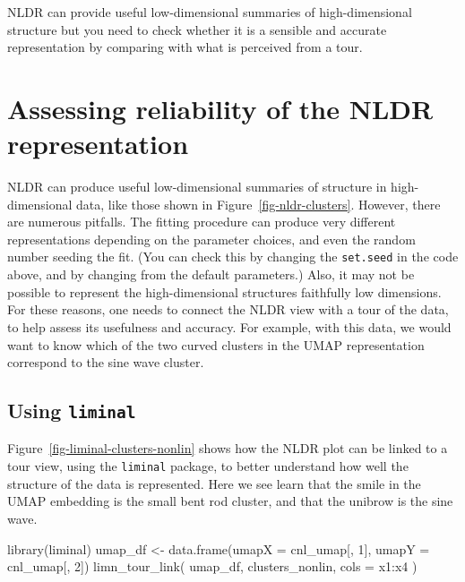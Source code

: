 \documentclass[
  letterpaper,
]{krantz}
\newenvironment{Shaded}{\begin{snugshade}}{\end{snugshade}}
\newcommand{\AttributeTok}[1]{\textcolor[rgb]{0.40,0.45,0.13}{#1}}
\newcommand{\DecValTok}[1]{\textcolor[rgb]{0.68,0.00,0.00}{#1}}
\newcommand{\FunctionTok}[1]{\textcolor[rgb]{0.28,0.35,0.67}{#1}}
\newcommand{\NormalTok}[1]{\textcolor[rgb]{0.00,0.23,0.31}{#1}}
\newcommand{\OtherTok}[1]{\textcolor[rgb]{0.00,0.23,0.31}{#1}}
\newcommand{\SpecialCharTok}[1]{\textcolor[rgb]{0.37,0.37,0.37}{#1}}
\begin{document}
NLDR can provide useful low-dimensional summaries of high-dimensional
structure but you need to check whether it is a sensible and accurate
representation by comparing with what is perceived from a tour.

\section{Assessing reliability of the NLDR
representation}\label{assessing-reliability-of-the-nldr-representation}

NLDR can produce useful low-dimensional summaries of structure in
high-dimensional data, like those shown in
Figure~\ref{fig-nldr-clusters}. However, there are numerous pitfalls.
The fitting procedure can produce very different representations
depending on the parameter choices, and even the random number seeding
the fit. (You can check this by changing the \texttt{set.seed} in the
code above, and by changing from the default parameters.) Also, it may
not be possible to represent the high-dimensional structures faithfully
low dimensions. For these reasons, one needs to connect the NLDR view
with a tour of the data, to help assess its usefulness and accuracy. For
example, with this data, we would want to know which of the two curved
clusters in the UMAP representation correspond to the sine wave cluster.

\subsection{\texorpdfstring{Using
\texttt{liminal}}{Using liminal}}\label{using-liminal}


Figure~\ref{fig-liminal-clusters-nonlin} shows how the NLDR plot can be
linked to a tour view, using the \texttt{liminal} package, to better
understand how well the structure of the data is represented. Here we
see learn that the smile in the UMAP embedding is the small bent rod
cluster, and that the unibrow is the sine wave.

\begin{Shaded}
\begin{Highlighting}[]
\FunctionTok{library}\NormalTok{(liminal)}
\NormalTok{umap\_df }\OtherTok{\textless{}{-}} \FunctionTok{data.frame}\NormalTok{(}\AttributeTok{umapX =}\NormalTok{ cnl\_umap[, }\DecValTok{1}\NormalTok{],}
                      \AttributeTok{umapY =}\NormalTok{ cnl\_umap[, }\DecValTok{2}\NormalTok{])}
\FunctionTok{limn\_tour\_link}\NormalTok{(}
\NormalTok{  umap\_df,}
\NormalTok{  clusters\_nonlin,}
  \AttributeTok{cols =}\NormalTok{ x1}\SpecialCharTok{:}\NormalTok{x4}
\NormalTok{)}
\end{Highlighting}
\end{Shaded}
\end{document}
